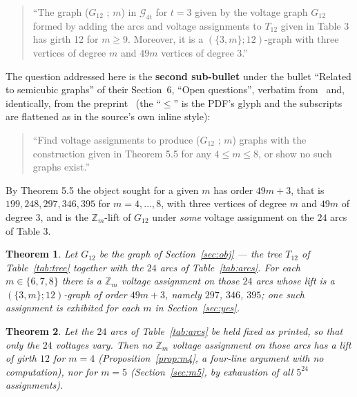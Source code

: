 \documentclass[11pt]{amsart}
\newtheorem{theorem}{Theorem}
\theoremstyle{remark}
\newcommand{\Zm}{\mathbb{Z}_m}
\newcommand{\Gt}{G_{12}}
\newcommand{\Tt}{T_{12}}
\begin{document}
\begin{quote}
``The graph ($\Gt$ ; $m$) in $\mathcal{G}_{4t}$ for $t = 3$ given by the voltage
graph $\Gt$ formed by adding the arcs and voltage assignments to $\Tt$ given in
Table 3 has girth 12 for $m \ge 9$. Moreover, it is a $(\{3, m\}; 12)$-graph
with three vertices of degree $m$ and $49m$ vertices of degree 3.''
\end{quote}

The question addressed here is the \textbf{second sub-bullet} under the bullet
``Related to semicubic graphs'' of their Section~6, ``Open questions'', verbatim
from~\cite[p.~29]{AAB} and, identically, from the preprint~\cite{AABarxiv} (the
``$\le$'' is the PDF's glyph and the subscripts are flattened as in the source's
own inline style):

\begin{quote}
``Find voltage assignments to produce ($\Gt$ ; $m$) graphs with the
construction given in Theorem 5.5 for any $4 \le m \le 8$, or show no such
graphs exist.''
\end{quote}

By Theorem 5.5 the object sought for a given $m$ has order $49m+3$, that is
$199, 248, 297, 346, 395$ for $m = 4, \dots, 8$, with three vertices of degree
$m$ and $49m$ of degree $3$, and is the $\Zm$-lift of $\Gt$ under \emph{some}
voltage assignment on the $24$ arcs of Table 3.

\begin{theorem}\label{thm:main}
Let $\Gt$ be the graph of Section~\textup{\ref{sec:obj}} --- the tree $\Tt$ of
Table~\textup{\ref{tab:tree}} together with the $24$ arcs of
Table~\textup{\ref{tab:arcs}}. For each $m \in \{6,7,8\}$ there is a $\Zm$
voltage assignment on those $24$ arcs whose lift is a $(\{3,m\};12)$-graph of
order $49m+3$, namely $297$, $346$, $395$; one such assignment is exhibited for
each $m$ in Section~\textup{\ref{sec:yes}}.
\end{theorem}

\begin{theorem}\label{thm:no}
Let the $24$ arcs of Table~\textup{\ref{tab:arcs}} be held fixed as printed, so
that only the $24$ voltages vary. Then no $\Zm$ voltage assignment on those
arcs has a lift of girth $12$ for $m = 4$
\textup{(}Proposition~\textup{\ref{prop:m4}}, a four-line argument with no
computation\textup{)}, nor for $m = 5$
\textup{(}Section~\textup{\ref{sec:m5}}, by exhaustion of all $5^{24}$
assignments\textup{)}.
\end{theorem}
\end{document}
